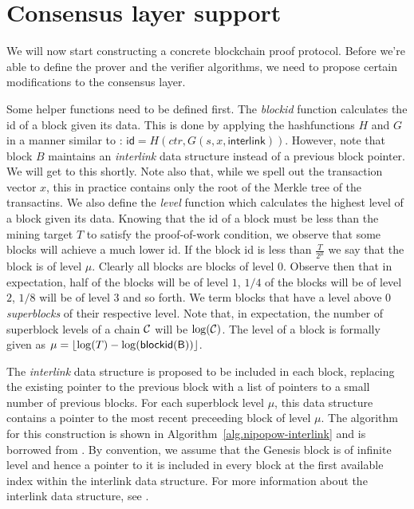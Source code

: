\section{Consensus layer support}

We will now start constructing a concrete blockchain proof protocol. Before
we're able to define the prover and the verifier algorithms, we need to propose
certain modifications to the consensus layer.

Some helper functions need to be defined first.  The \textit{blockid} function
calculates the id of a block given its data. This is done by applying the
hashfunctions $H$ and $G$ in a manner similar to \cite{backbone}:
$\textsf{id} = H(ctr, G(s, x, \textsf{interlink}))$. However, note that block
$B$ maintains an \textit{interlink} data structure instead of a previous block
pointer. We will get to this shortly. Note also that, while we spell out the
transaction vector $x$, this in practice contains only the root of the Merkle
tree of the transactins. We also define the \textit{level} function which
calculates the highest level of a block given its data. Knowing that the id of
a block must be less than the mining target $T$ to satisfy the proof-of-work
condition, we observe that some blocks will achieve a much lower id. If the
block id is less than $\frac{T}{2^\mu}$ we say that the block is of level
$\mu$. Clearly all blocks are blocks of level $0$. Observe then that in
expectation, half of the blocks will be of level $1$, $1/4$ of the blocks will
be of level $2$, $1/8$ will be of level $3$ and so forth. We term blocks that
have a level above 0 \textit{superblocks} of their respective level. Note that,
in expectation, the number of superblock levels of a chain $\mathcal{C}$ will be
$\log(\mathcal{C})$. The level of a block is formally given as $\mu = \left \lfloor
\log(T) - \log(\sf{blockid}(B)) \right \rfloor$.

The \textit{interlink} data structure is proposed to be included in each block,
replacing the existing pointer to the previous block with a list of pointers to
a small number of previous blocks. For each superblock level $\mu$, this data
structure contains a pointer to the most recent preceeding block of level
$\mu$. The algorithm for this construction is shown in
Algorithm~\ref{alg.nipopow-interlink} and is borrowed from \cite{KLS}. By
convention, we assume that the Genesis block is of infinite level and hence a
pointer to it is included in every block at the first available index within
the interlink data structure. For more information about the interlink data
structure, see \cite{KLS}.

